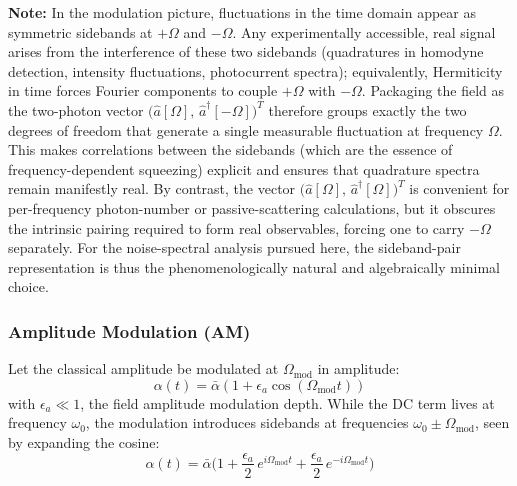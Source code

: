 \noindent\textbf{Note: }
In the modulation picture, fluctuations in the time domain appear as symmetric sidebands at \(+\Omega\) and \(-\Omega\).
Any experimentally accessible, real signal arises from the interference of these two sidebands (quadratures in homodyne detection, intensity fluctuations, photocurrent spectra); equivalently, Hermiticity in time forces Fourier components to couple \(+\Omega\) with \(-\Omega\).
Packaging the field as the two-photon vector \(\big(\hat a[\Omega],\,\hat a^\dagger[-\Omega]\big)^{T}\) therefore groups exactly the two degrees of freedom that generate a single measurable fluctuation at frequency \(\Omega\). This makes correlations between the sidebands (which are the essence of frequency-dependent squeezing) explicit and ensures that quadrature spectra remain manifestly real. By contrast, the vector \(\big(\hat a[\Omega],\,\hat a^\dagger[\Omega]\big)^{T}\) is convenient for per-frequency photon-number or passive-scattering calculations, but it obscures the intrinsic pairing required to form real observables, forcing one to carry \(-\Omega\) separately.
For the noise-spectral analysis pursued here, the sideband-pair representation is thus the phenomenologically natural and algebraically minimal choice.


\subsubsection*{Amplitude Modulation (AM)}

Let the classical amplitude be modulated at $\Omega_{\text{mod}}$ in amplitude:
\begin{equation}
  \alpha(t) = \bar{\alpha} \left(1 + \epsilon_a \cos(\Omega_{\text{mod}} t)\right)
\end{equation}
with $\epsilon_a \ll 1$, the field amplitude modulation depth. While the DC term lives at frequency $\omega_0$, the modulation introduces sidebands at frequencies $\omega_0 \pm \Omega_{\text{mod}}$, seen by expanding the cosine:
\begin{equation}
  \alpha(t) = \bar{\alpha} \Big( 1 + \frac{\epsilon_a }{2}\, e^{i\Omega_{\text{mod}} t} + \frac{\epsilon_a }{2} \,  e^{-i\Omega_{\text{mod}} t} \Big)
\end{equation}


